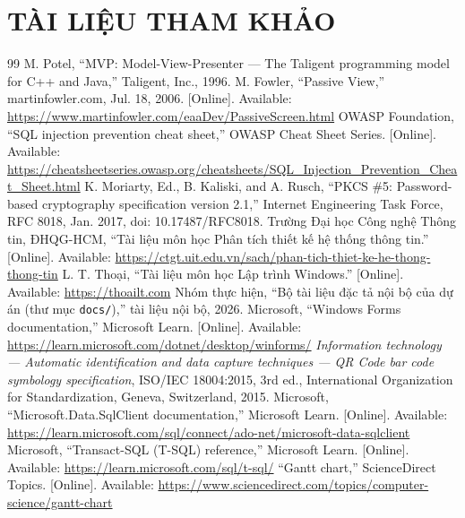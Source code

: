 \documentclass[14pt]{report}
\newcommand{\TieuDeDau}[1]{\markboth{#1}{#1}}
\begin{document}


\chapter*{TÀI LIỆU THAM KHẢO}
\TieuDeDau{TÀI LIỆU THAM KHẢO}
\begin{thebibliography}{99}
   M. Potel, ``MVP: Model-View-Presenter --- The Taligent programming model for C++ and Java,'' Taligent, Inc., 1996.
   M. Fowler, ``Passive View,'' martinfowler.com, Jul. 18, 2006. [Online]. Available: \url{https://www.martinfowler.com/eaaDev/PassiveScreen.html}
   OWASP Foundation, ``SQL injection prevention cheat sheet,'' OWASP Cheat Sheet Series. [Online]. Available: \url{https://cheatsheetseries.owasp.org/cheatsheets/SQL_Injection_Prevention_Cheat_Sheet.html}
   K. Moriarty, Ed., B. Kaliski, and A. Rusch, ``PKCS \#5: Password-based cryptography specification version 2.1,'' Internet Engineering Task Force, RFC 8018, Jan. 2017, doi: 10.17487/RFC8018.
   Trường Đại học Công nghệ Thông tin, ĐHQG-HCM, ``Tài liệu môn học Phân tích thiết kế hệ thống thông tin.'' [Online]. Available: \url{https://ctgt.uit.edu.vn/sach/phan-tich-thiet-ke-he-thong-thong-tin}
   L. T. Thoại, ``Tài liệu môn học Lập trình Windows.'' [Online]. Available: \url{https://thoailt.com}
   Nhóm thực hiện, ``Bộ tài liệu đặc tả nội bộ của dự án (thư mục \texttt{docs/}),'' tài liệu nội bộ, 2026.
   Microsoft, ``Windows Forms documentation,'' Microsoft Learn. [Online]. Available: \url{https://learn.microsoft.com/dotnet/desktop/winforms/}
   \emph{Information technology --- Automatic identification and data capture techniques --- QR Code bar code symbology specification}, ISO/IEC 18004:2015, 3rd ed., International Organization for Standardization, Geneva, Switzerland, 2015.
   Microsoft, ``Microsoft.Data.SqlClient documentation,'' Microsoft Learn. [Online]. Available: \url{https://learn.microsoft.com/sql/connect/ado-net/microsoft-data-sqlclient}
   Microsoft, ``Transact-SQL (T-SQL) reference,'' Microsoft Learn. [Online]. Available: \url{https://learn.microsoft.com/sql/t-sql/}
   ``Gantt chart,'' ScienceDirect Topics. [Online]. Available: \url{https://www.sciencedirect.com/topics/computer-science/gantt-chart}

\end{thebibliography}
\end{document}
